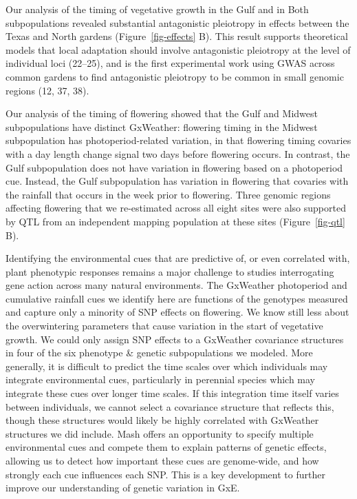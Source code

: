 \documentclass[
  9pt,
  twocolumn,
  twoside]{pnas-new}
\begin{document}
Our analysis of the timing of vegetative growth in the Gulf and in Both
subpopulations revealed substantial antagonistic pleiotropy in effects
between the Texas and North gardens (Figure~\ref{fig-effects} B). This
result supports theoretical models that local adaptation should involve
antagonistic pleiotropy at the level of individual loci (22--25), and is
the first experimental work using GWAS across common gardens to find
antagonistic pleiotropy to be common in small genomic regions (12, 37,
38).

Our analysis of the timing of flowering showed that the Gulf and Midwest
subpopulations have distinct GxWeather: flowering timing in the Midwest
subpopulation has photoperiod-related variation, in that flowering
timing covaries with a day length change signal two days before
flowering occurs. In contrast, the Gulf subpopulation does not have
variation in flowering based on a photoperiod cue. Instead, the Gulf
subpopulation has variation in flowering that covaries with the rainfall
that occurs in the week prior to flowering. Three genomic regions
affecting flowering that we re-estimated across all eight sites were
also supported by QTL from an independent mapping population at these
sites (Figure~\ref{fig-qtl} B).

Identifying the environmental cues that are predictive of, or even
correlated with, plant phenotypic responses remains a major challenge to
studies interrogating gene action across many natural environments. The
GxWeather photoperiod and cumulative rainfall cues we identify here are
functions of the genotypes measured and capture only a minority of SNP
effects on flowering. We know still less about the overwintering
parameters that cause variation in the start of vegetative growth. We
could only assign SNP effects to a GxWeather covariance structures in
four of the six phenotype \& genetic subpopulations we modeled. More
generally, it is difficult to predict the time scales over which
individuals may integrate environmental cues, particularly in perennial
species which may integrate these cues over longer time scales. If this
integration time itself varies between individuals, we cannot select a
covariance structure that reflects this, though these structures would
likely be highly correlated with GxWeather structures we did include.
Mash offers an opportunity to specify multiple environmental cues and
compete them to explain patterns of genetic effects, allowing us to
detect how important these cues are genome-wide, and how strongly each
cue influences each SNP. This is a key development to further improve
our understanding of genetic variation in GxE.
\end{document}
